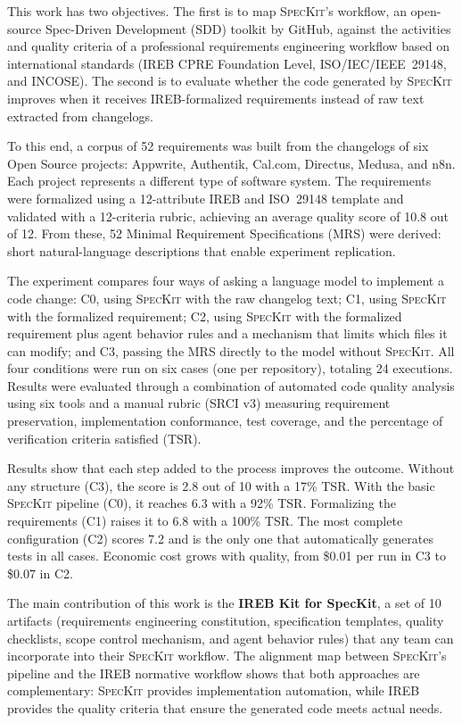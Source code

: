 \documentclass[minitoc, hidelinks, headlogo, framedcover]{tfeEPCC}
\begin{document}
This work has two objectives. The first is to map \textsc{SpecKit}'s workflow, an open-source Spec-Driven Development (SDD) toolkit by GitHub, against the activities and quality criteria of a professional requirements engineering workflow based on international standards (IREB CPRE Foundation Level, ISO/IEC/IEEE~29148, and INCOSE). The second is to evaluate whether the code generated by \textsc{SpecKit} improves when it receives IREB-formalized requirements instead of raw text extracted from changelogs.

To this end, a corpus of 52 requirements was built from the changelogs of six Open Source projects: Appwrite, Authentik, Cal.com, Directus, Medusa, and n8n. Each project represents a different type of software system. The requirements were formalized using a 12-attribute IREB and ISO~29148 template and validated with a 12-criteria rubric, achieving an average quality score of 10.8 out of 12. From these, 52 Minimal Requirement Specifications (MRS) were derived: short natural-language descriptions that enable experiment replication.

The experiment compares four ways of asking a language model to implement a code change: C0, using \textsc{SpecKit} with the raw changelog text; C1, using \textsc{SpecKit} with the formalized requirement; C2, using \textsc{SpecKit} with the formalized requirement plus agent behavior rules and a mechanism that limits which files it can modify; and C3, passing the MRS directly to the model without \textsc{SpecKit}. All four conditions were run on six cases (one per repository), totaling 24 executions. Results were evaluated through a combination of automated code quality analysis using six tools and a manual rubric (SRCI v3) measuring requirement preservation, implementation conformance, test coverage, and the percentage of verification criteria satisfied (TSR).

Results show that each step added to the process improves the outcome. Without any structure (C3), the score is 2.8 out of 10 with a 17\% TSR. With the basic \textsc{SpecKit} pipeline (C0), it reaches 6.3 with a 92\% TSR. Formalizing the requirements (C1) raises it to 6.8 with a 100\% TSR. The most complete configuration (C2) scores 7.2 and is the only one that automatically generates tests in all cases. Economic cost grows with quality, from \$0.01 per run in C3 to \$0.07 in C2.

The main contribution of this work is the \textbf{IREB Kit for SpecKit}, a set of 10 artifacts (requirements engineering constitution, specification templates, quality checklists, scope control mechanism, and agent behavior rules) that any team can incorporate into their \textsc{SpecKit} workflow. The alignment map between \textsc{SpecKit}'s pipeline and the IREB normative workflow shows that both approaches are complementary: \textsc{SpecKit} provides implementation automation, while IREB provides the quality criteria that ensure the generated code meets actual needs.
\end{document}
